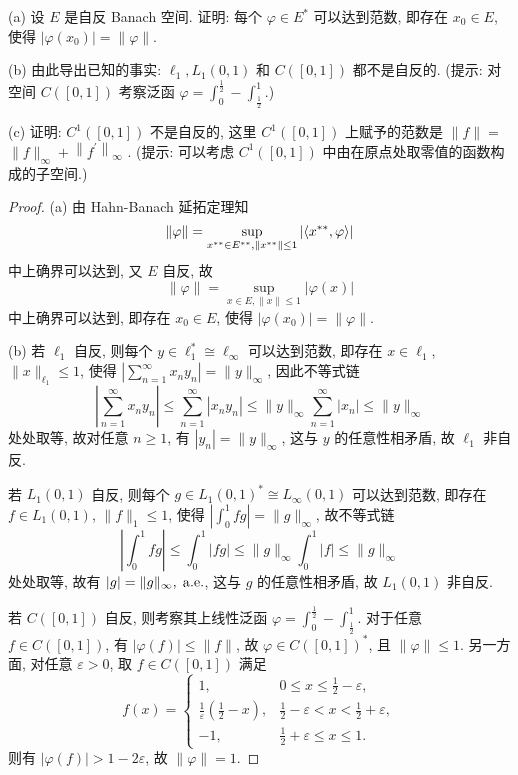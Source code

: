 \begin{exercise}[12]
    (a) 设 $E$ 是自反 Banach 空间. 证明: 每个 $\varphi \in E^{*}$ 可以达到范数, 
    即存在 $x_{0} \in E$, 使得 $\left|\varphi\left(x_{0}\right)\right|=\|\varphi\|$.
    
    (b) 由此导出已知的事实: $\ell_{1}, L_{1}(0,1)$ 和 $C([0,1])$ 都不是自反的. 
    (提示: 对空间 $C([0,1])$ 考察泛函 $\varphi=\int_{0}^{\frac{1}{2}}-\int_{\frac{1}{2}}^{1}$.)

    (c) 证明: $C^{1}([0,1])$ 不是自反的, 
    这里 $C^{1}([0,1])$ 上赋予的范数是 $\|f\|=$ $\|f\|_{\infty}+\left\|f^{\prime}\right\|_{\infty}$ .
    (提示: 可以考虑 $C^{1}([0,1])$ 中由在原点处取零值的函数构成的子空间.)
\end{exercise}

\begin{proof}
    (a) 由 Hahn-Banach 延拓定理知
    \[\|\varphi\|=\sup_{x^{**}\in E^{**},\|x^{**}\|\leq 1}|\langle x^{**},\varphi\rangle|\]
    中上确界可以达到, 又 $E$ 自反, 故
    \[\|\varphi\|=\sup_{x\in E,\|x\|\leq 1}|\varphi(x)|\]
    中上确界可以达到, 即存在 $x_0\in E$, 使得 $|\varphi(x_0)|=\|\varphi\|$.

    (b) 若 $\ell_1$ 自反, 则每个 $y\in\ell_1^*\cong\ell_{\infty}$ 可以达到范数,
    即存在 $x\in\ell_1$, $\|x\|_{\ell_1}\leq 1$, 使得 $|\sum_{n=1}^{\infty}x_ny_n|=\|y\|_{\infty}$, 因此不等式链
    \[\left|\sum_{n=1}^{\infty}x_ny_n\right|\leq\sum_{n=1}^{\infty}|x_ny_n|\leq\|y\|_{\infty}\sum_{n=1}^{\infty}|x_n|\leq\|y\|_{\infty}\]
    处处取等, 故对任意 $n\geq 1$, 有 $|y_n|=\|y\|_{\infty}$, 这与 $y$ 的任意性相矛盾, 故 $\ell_1$ 非自反.

    若 $L_1(0,1)$ 自反, 则每个 $g\in L_1(0,1)^*\cong L_{\infty}(0,1)$ 可以达到范数,
    即存在 $f\in L_1(0,1)$, $\|f\|_1\leq 1$, 使得 $|\int_0^1 fg|=\|g\|_{\infty}$, 故不等式链
    \[\left|\int_0^1 fg\right|\leq\int_0^1 |fg|\leq\|g\|_{\infty}\int_0^1 |f|\leq\|g\|_{\infty}\]
    处处取等, 故有 $|g|=\|g\|_{\infty},\;\mathrm{a.e.}$, 这与 $g$ 的任意性相矛盾, 故 $L_1(0,1)$ 非自反.

    若 $C([0,1])$ 自反, 则考察其上线性泛函 $\varphi=\int_0^{\frac{1}{2}}-\int_{\frac{1}{2}}^1$.
    对于任意 $f\in C([0,1])$, 有 $|\varphi(f)|\leq\|f\|$, 故 $\varphi\in C([0,1])^*$, 且 $\|\varphi\|\leq 1$.
    另一方面, 对任意 $\varepsilon>0$, 取 $f\in C([0,1])$ 满足
    \[f(x)=\begin{cases}
        1, & 0\leq x\leq\frac{1}{2}-\varepsilon, \\
        \frac{1}{\varepsilon}\left(\frac{1}{2}-x\right), & \frac{1}{2}-\varepsilon<x<\frac{1}{2}+\varepsilon, \\
        -1, & \frac{1}{2}+\varepsilon\leq x\leq 1.
    \end{cases}\]
    则有 $|\varphi(f)|>1-2\varepsilon$, 故 $\|\varphi\|=1$.


\end{proof}
